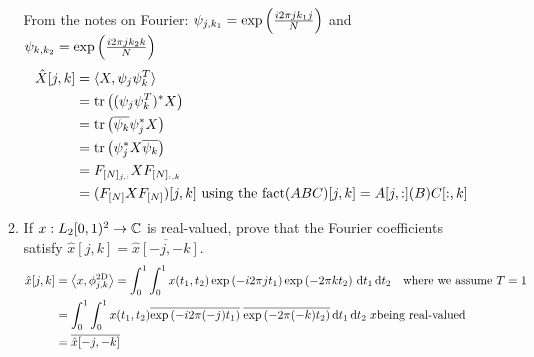 \documentclass[12pt,twoside]{article}
\begin{document}
\begin{enumerate}
\begin{enumerate}
    From the notes on Fourier: $\psi_{j, k_1} = \exp \left(  \frac{ i2 \pi j k_1j}{N}  \right)$  and  $\psi_{k, k_2} = \exp \left(  \frac{ i2 \pi j k_2 k}{N}  \right)$
    \begin{align*}
    	\hat{X}[j,k] 	&=	 \langle X,\psi_j\psi_k^T\rangle \\
				&=	\operatorname{tr}\left(  (\psi_j\psi_k^T)^*  X \right)\\
				&=	\operatorname{tr}\left( \overline{\psi_k} \psi_j^* X \right) \\
				&= 	\operatorname{tr}\left( \psi_j^* X \overline{\psi_k} \right) \\
				&= 	F_{[N]_{j,:}} X F_{[N]_{:,k}} \\ 
				&= 	(F_{[N]}XF_{[N]})[j,k] \text{ using the fact} (ABC)[j,k] = A[j,:](B)C[:,k] \\
    \end{align*}
    
  \item If $x:L_2[0,1)^2\to\mathbb{C}$ is real-valued, prove that the Fourier
    coefficients satisfy $\hat{x}[j,k]=\overline{\hat{x}[-j,-k]}$.\\
\begin{align*}
   	\hat{x}[j,k]	   	&= \left \langle x, \phi_{j,k}^{\text{2D}}\right \rangle = \int_0^1 \int_0^1 x(t_1, t_2) \exp \left( - i2 \pi j t_1  \right)  \exp \left( - 2 \pi k t_2  \right) \, \text{d}t_1 \, \text{d}t_2 \text{ ~ where we assume } T = 1\\ 	
				&=   \int_0^1 \int_0^1 x(t_1, t_2) \overline{\exp \left( - i2 \pi (-j) t_1  \right)}  \;  \overline{\exp \left( - 2 \pi (-k) t_2  \right)} \, \text{d}t_1 \, \text{d}t_2 \; x \text{being real-valued}\\
				&= \overline{\hat{x}[-j,-k]} \\
\end{align*}
   
  \end{enumerate}
  

\end{enumerate}
\end{document}
